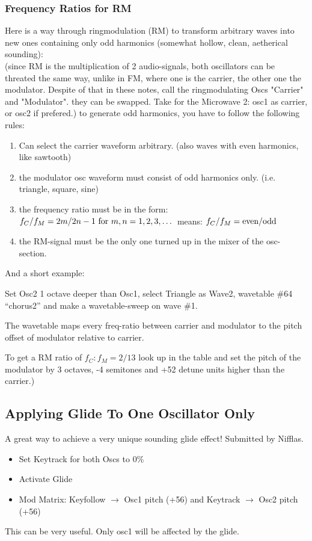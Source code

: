 \subsubsection{Frequency Ratios for RM}
Here is a way through ringmodulation (RM) to transform arbitrary waves into new ones containing only odd harmonics (somewhat hollow, clean, aetherical sounding):\\
(since RM is the multiplication of 2 audio-signals, both oscillators can be threated the same way, unlike in FM, where one is the carrier, the other one the modulator. Despite of that in these notes, call the ringmodulating Oscs "Carrier" and "Modulator". they can be swapped. Take for the Microwave 2: osc1 as carrier, or osc2 if prefered.)
to generate odd harmonics, you have to follow the following rules:
\begin{enumerate}
	\item Can select the carrier waveform arbitrary. (also waves with even harmonics, like sawtooth)
	\item the modulator osc waveform must consist of odd harmonics only. (i.e. triangle, square, sine)
	\item the frequency ratio must be in the form: 
	$f_C / f_M = 2m / 2n-1 \text{ for } m,n = 1, 2, 3,\dots$
	means: $f_C / f_M = \text{even} / \text{odd}$
	\item the RM-signal must be the only one turned up in the mixer of the osc-section.
\end{enumerate}
And a short example:
\begin{example}[Microwave 2/XT(k)]
	Set Osc2 1 octave deeper than Osc1, select Triangle as Wave2, wavetable \#64 ``chorus2'' and make a wavetable-sweep on wave \#1.
\end{example}
The wavetable maps every freq-ratio between carrier and modulator to the pitch offset of modulator relative to carrier.
\begin{example}
	To get a RM ratio of $f_C\colon f_M = 2 / 13$ look up in the table and set the pitch of the modulator by 3 octaves, -4 semitones and +52 detune units higher than the carrier.)
\end{example}
\subsection{Applying Glide To One Oscillator Only}
A great way to achieve a very unique sounding glide effect! Submitted by Nifflas.
\begin{itemize}
	\item Set Keytrack for both Oscs to 0\%
	\item Activate Glide
	\item Mod Matrix: Keyfollow $\to$ Osc1 pitch (+56) and Keytrack $\to$ Osc2 pitch (+56)
\end{itemize}
This can be very useful. Only osc1 will be affected by the glide.
